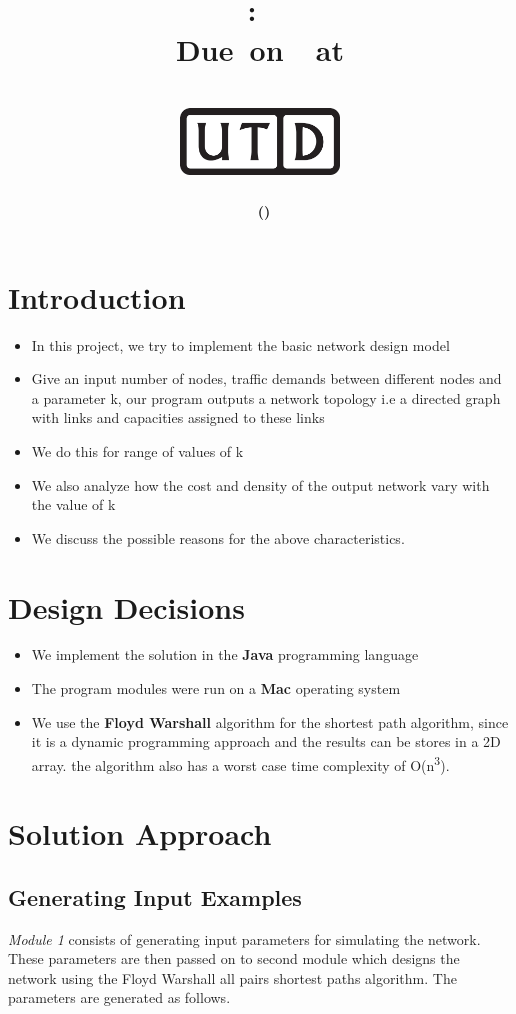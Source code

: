 \documentclass[12pt,letterpaper,titlepage,en-US]{article}
\title{
    \vspace{1in}
    \textmd{\textbf{\hmwkClassName \\\hmwkClass:\ \hmwkTitle }}\\
    \normalsize\vspace{0.1in}\small{Due\ on\ \DTMusedate{DueDate}\ at \DTMusetime{DueDate} }\\
    \vspace{0.1in}\large{\textit{\hmwkClassInstructor}}\\
    \vspace{0.5in}\includegraphics[height=2.4em]{UTD_logo_BW}\\
    \vspace{2in}
}
\author{\textbf{\hmwkAuthorName\ \footnotesize{(\hmwkAuthorNetID)}} \\ }
\date{}
\begin{document}
\maketitle
{}

\tableofcontents

\pagebreak
{}

\section{Introduction}
\begin{itemize}
\item In this project, we try to implement the basic network design model
\item Give an input number of nodes, traffic demands between different nodes and a parameter k, our program outputs a network topology i.e a directed graph with links and capacities assigned to these links
\item We do this for range of values of k
\item  We also analyze how the cost and density of the output network vary with the value of k
\item We discuss the possible reasons for the above characteristics.
\end{itemize}

\section{Design Decisions}
\begin{itemize}
\item We implement the solution in the \textbf{Java} programming language
\item The program modules were run on a \textbf{Mac} operating system
\item We use the \textbf{Floyd Warshall} algorithm for the shortest path algorithm, since it is a dynamic programming approach and the results can be stores in a 2D array. the algorithm also  has a worst case time complexity of O(n\textsuperscript{3}).
\end{itemize}





\section{Solution Approach}

\subsection{Generating Input Examples}
\textit{Module 1} consists of generating input parameters for simulating the network.
These parameters are then passed on to second module which designs the network using the Floyd Warshall all pairs shortest paths algorithm. The parameters are generated as follows.
\end{document}
